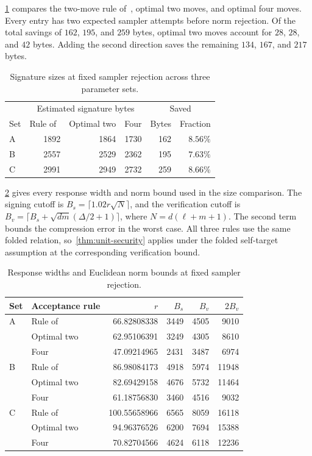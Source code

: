 \cref{tab:four-sizes} compares the two-move rule of~\cite{GartnerFull}, optimal two moves, and optimal four moves. Every entry has two expected sampler attempts before norm rejection. Of the total savings of $162$, $195$, and $259$ bytes, optimal two moves account for $28$, $28$, and $42$ bytes. Adding the second direction saves the remaining $134$, $167$, and $217$ bytes.
\begin{table}[!htbp]
\centering
\begin{tabular}{lrrrrr}
\toprule
& \multicolumn{3}{c}{Estimated signature bytes} & \multicolumn{2}{c}{Saved}\\
Set & Rule of~\cite{GartnerFull} & Optimal two & Four & Bytes & Fraction\\
\midrule
A & 1892 & 1864 & 1730 & 162 & $8.56\%$\\
B & 2557 & 2529 & 2362 & 195 & $7.63\%$\\
C & 2991 & 2949 & 2732 & 259 & $8.66\%$\\
\bottomrule
\end{tabular}
\caption{Signature sizes at fixed sampler rejection across three parameter sets.}
\label{tab:four-sizes}
\end{table}

\cref{tab:four-bounds} gives every response width and norm bound used in the size comparison. The signing cutoff is $B_s=\lceil1.02r\sqrt N\rceil$, and the verification cutoff is $B_v=\lceil B_s+\sqrt{dm}(\Delta/2+1)\rceil$, where $N=d(\ell+m+1)$. The second term bounds the compression error in the worst case. All three rules use the same folded relation, so~\cref{thm:unit-security} applies under the folded self-target assumption at the corresponding verification bound.
\begin{table}[!htbp]
\centering
\begin{tabular}{llrrrr}
\toprule
Set & Acceptance rule & $r$ & $B_s$ & $B_v$ & $2B_v$\\
\midrule
A & Rule of~\cite{GartnerFull} & 66.82808338 & 3449 & 4505 & 9010\\
  & Optimal two & 62.95106391 & 3249 & 4305 & 8610\\
  & Four & 47.09214965 & 2431 & 3487 & 6974\\
\midrule
B & Rule of~\cite{GartnerFull} & 86.98084173 & 4918 & 5974 & 11948\\
  & Optimal two & 82.69429158 & 4676 & 5732 & 11464\\
  & Four & 61.18756830 & 3460 & 4516 & 9032\\
\midrule
C & Rule of~\cite{GartnerFull} & 100.55658966 & 6565 & 8059 & 16118\\
  & Optimal two & 94.96376526 & 6200 & 7694 & 15388\\
  & Four & 70.82704566 & 4624 & 6118 & 12236\\
\bottomrule
\end{tabular}
\caption{Response widths and Euclidean norm bounds at fixed sampler rejection.}
\label{tab:four-bounds}
\end{table}

